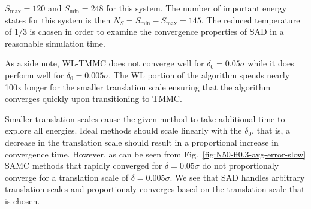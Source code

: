 \documentclass[letterpaper,twocolumn,amsmath,amssymb,pre,aps,10pt]{revtex4-1}
\begin{document}
{\color{red}
$S_{\max} = 120$ and $S_{\min} = 248$ for this system.  The number of
important energy states for this system is then $N_S = S_{\min} - S_{\max} = 145$.
The reduced temperature of $1/3$ is chosen in order to examine the convergence
properties of SAD in a reasonable simulation time.

As a side note, WL-TMMC does not converge well for $\delta_0 = 0.05\sigma$ while
it does perform well for $\delta_0 = 0.005\sigma$. The WL portion of the algorithm
spends nearly 100x longer for the smaller translation scale ensuring that the algorithm
converges quickly upon transitioning to TMMC.
}

Smaller translation
scales cause the given method to take additional time to explore all
energies. Ideal methods should scale linearly with the $\delta_0$, that
is, a decrease in the translation scale should result in a proportional
increase in convergence time. However, as can be seen from
Fig.~\ref{fig:N50-ff0.3-avg-error-slow} SAMC methods that rapidly
converged for $\delta = 0.05\sigma$ do not proportionaly converge for a
translation scale of $\delta = 0.005\sigma$. We see that SAD handles
arbitrary translation scales and proportionaly converges based on the
translation scale that is chosen.
\end{document}
